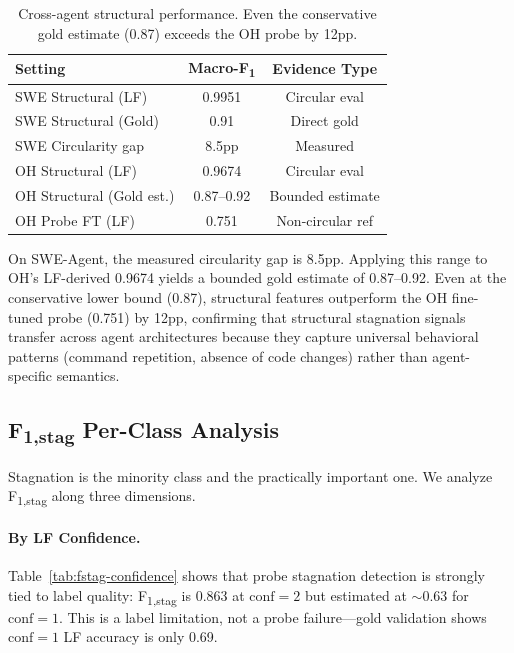 \documentclass[11pt,a4paper]{article}
\newcommand{\fone}{F\textsubscript{1}}
\newcommand{\fstagone}{F\textsubscript{1,stag}}
\begin{document}
\begin{table}[t]
\centering
\small
\begin{tabular}{lcc}
\toprule
Setting & Macro-\fone{} & Evidence Type \\
\midrule
SWE Structural (LF) & 0.9951 & Circular eval \\
SWE Structural (Gold) & 0.91 & Direct gold \\
SWE Circularity gap & 8.5pp & Measured \\
\midrule
OH Structural (LF) & 0.9674 & Circular eval \\
OH Structural (Gold est.) & 0.87--0.92 & Bounded estimate \\
OH Probe FT (LF) & 0.751 & Non-circular ref \\
\bottomrule
\end{tabular}
\caption{Cross-agent structural performance. Even the conservative gold estimate (0.87) exceeds the OH probe by 12pp.}
\label{tab:cross-agent}
\end{table}

On SWE-Agent, the measured circularity gap is 8.5pp. Applying this range to OH's LF-derived 0.9674 yields a bounded gold estimate of 0.87--0.92. Even at the conservative lower bound (0.87), structural features outperform the OH fine-tuned probe (0.751) by 12pp, confirming that structural stagnation signals transfer across agent architectures because they capture universal behavioral patterns (command repetition, absence of code changes) rather than agent-specific semantics.

\subsection{\fstagone{} Per-Class Analysis}
\label{sec:fstag-analysis}

Stagnation is the minority class and the practically important one. We analyze \fstagone{} along three dimensions.

\paragraph{By LF Confidence.}
Table~\ref{tab:fstag-confidence} shows that probe stagnation detection is strongly tied to label quality: \fstagone{} is 0.863 at $\text{conf}{=}2$ but estimated at $\sim$0.63 for $\text{conf}{=}1$. This is a label limitation, not a probe failure---gold validation shows $\text{conf}{=}1$ LF accuracy is only 0.69.
\end{document}
